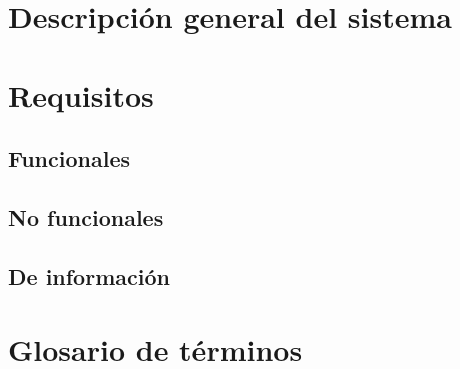 \section{Descripción general del sistema}

\newpage

\section{Requisitos}
\subsection{Funcionales}

\newpage
\subsection{No funcionales}

\newpage
\subsection{De información}

\newpage

\section{Glosario de términos}

\newpage


